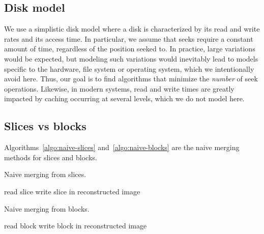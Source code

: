 \documentclass[10pt, conference, compsocconf]{IEEEtran}
\newcommand{\todo}[1]{\marginpar{\parbox{18mm}{\flushleft\tiny\color{red}\textbf{TODO}:
      #1}}}
\begin{document}
\subsection{Disk model}

We use a simplistic disk model where a disk is characterized by its
read and write rates and its access time. In particular, we assume
that seeks require a constant amount of time, regardless of the
position seeked to. In practice, large variations would be expected,
but modeling such variations would inevitably lead to models specific
to the hardware, file system or operating system, which we
intentionally avoid here. Thus, our goal is to find algorithms that
minimize the \emph{number} of seek operations. Likewise, in modern
systems, read and write times are greatly impacted by caching
occurring at several levels, which we do not model here.


\subsection{Slices vs blocks}

Algorithms~\ref{algo:naive-slices} and~\ref{algo:naive-blocks} are the
naive merging methods for slices and blocks.
\begin{algorithm}[h]
\caption{Naive merging from slices.}
\label{algo:naive-slices} 
\begin{algorithmic}
    \STATE read slice
    \STATE write slice in reconstructed image
  \ENDFOR      
\end{algorithmic}
\end{algorithm}

\begin{algorithm}[h]
\caption{Naive merging from blocks.}
\label{algo:naive-blocks}
\begin{algorithmic}
    \STATE read block
    \STATE write block in reconstructed image
  \ENDFOR 
\end{algorithmic}
\end{algorithm}
\end{document}
